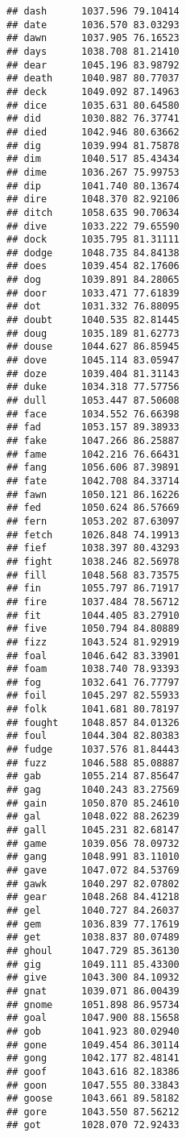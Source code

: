 \documentclass[
]{article}
\begin{document}
\begin{verbatim}
## dash      1037.596 79.10414
## date      1036.570 83.03293
## dawn      1037.905 76.16523
## days      1038.708 81.21410
## dear      1045.196 83.98792
## death     1040.987 80.77037
## deck      1049.092 87.14963
## dice      1035.631 80.64580
## did       1030.882 76.37741
## died      1042.946 80.63662
## dig       1039.994 81.75878
## dim       1040.517 85.43434
## dime      1036.267 75.99753
## dip       1041.740 80.13674
## dire      1048.370 82.92106
## ditch     1058.635 90.70634
## dive      1033.222 79.65590
## dock      1035.795 81.31111
## dodge     1048.735 84.84138
## does      1039.454 82.17606
## dog       1039.891 84.28065
## door      1033.471 77.61839
## dot       1031.332 76.88095
## doubt     1040.535 82.81445
## doug      1035.189 81.62773
## douse     1044.627 86.85945
## dove      1045.114 83.05947
## doze      1039.404 81.31143
## duke      1034.318 77.57756
## dull      1053.447 87.50608
## face      1034.552 76.66398
## fad       1053.157 89.38933
## fake      1047.266 86.25887
## fame      1042.216 76.66431
## fang      1056.606 87.39891
## fate      1042.708 84.33714
## fawn      1050.121 86.16226
## fed       1050.624 86.57669
## fern      1053.202 87.63097
## fetch     1026.848 74.19913
## fief      1038.397 80.43293
## fight     1038.246 82.56978
## fill      1048.568 83.73575
## fin       1055.797 86.71917
## fire      1037.484 78.56712
## fit       1044.405 83.27910
## five      1050.794 84.80889
## fizz      1043.524 81.92919
## foal      1046.642 83.33901
## foam      1038.740 78.93393
## fog       1032.641 76.77797
## foil      1045.297 82.55933
## folk      1041.681 80.78197
## fought    1048.857 84.01326
## foul      1044.304 82.80383
## fudge     1037.576 81.84443
## fuzz      1046.588 85.08887
## gab       1055.214 87.85647
## gag       1040.243 83.27569
## gain      1050.870 85.24610
## gal       1048.022 88.26239
## gall      1045.231 82.68147
## game      1039.056 78.09732
## gang      1048.991 83.11010
## gave      1047.072 84.53769
## gawk      1040.297 82.07802
## gear      1048.268 84.41218
## gel       1040.727 84.26037
## gem       1036.839 77.17619
## get       1038.837 80.07489
## ghoul     1047.729 85.36130
## gig       1049.111 85.43300
## give      1043.300 84.10932
## gnat      1039.071 86.00439
## gnome     1051.898 86.95734
## goal      1047.900 88.15658
## gob       1041.923 80.02940
## gone      1049.454 86.30114
## gong      1042.177 82.48141
## goof      1043.616 82.18386
## goon      1047.555 80.33843
## goose     1043.661 89.58182
## gore      1043.550 87.56212
## got       1028.070 72.92433

\end{verbatim}
\end{document}
